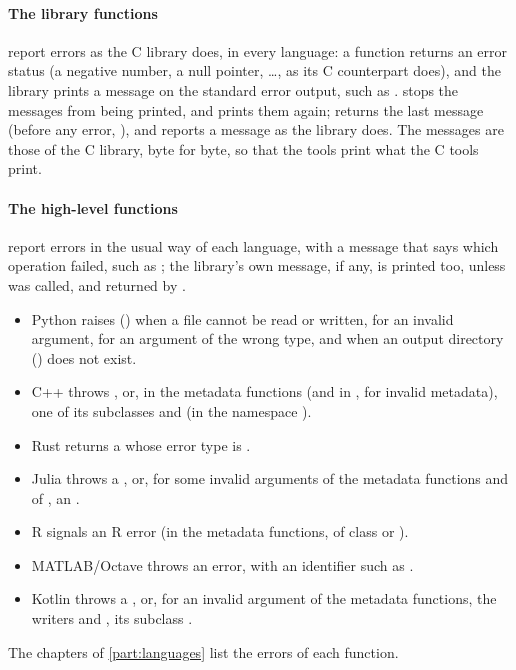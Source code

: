 \paragraph{The library functions} report errors as the C library does, in
every language: a function returns an error status (a negative number, a
null pointer, \ldots, as its C counterpart does), and the library prints a
message on the standard error output, such as .  stops the messages from being printed,
and  prints them again;  returns the
last message (before any error, ), and  reports a message as the
library does. The messages are those of the C library, byte for byte, so
that the tools print what the C tools print.

\paragraph{The high-level functions} report errors in the usual way of each
language, with a message that says which operation failed, such as
; the library's own message, if any, is printed
too, unless  was called, and returned by
.
\begin{itemize}
\item Python raises  () when a file cannot be
  read or written,  for an invalid argument,
   for an argument of the wrong type, and
   when an output directory () does not
  exist.
\item C++ throws , or, in the metadata functions (and
  in , for invalid metadata), one of its subclasses
   and  (in the namespace
  ).
\item Rust returns a  whose error type is
  .
\item Julia throws a , or, for some invalid arguments of
  the metadata functions and of , an
  .
\item R signals an R error (in the metadata functions, of class
   or ).
\item MATLAB/Octave throws an error, with an identifier such as
  .
\item Kotlin throws a , or, for an invalid argument of
  the metadata functions, the writers and , its
  subclass .
\end{itemize}
The chapters of \cref{part:languages} list the errors of each function.

